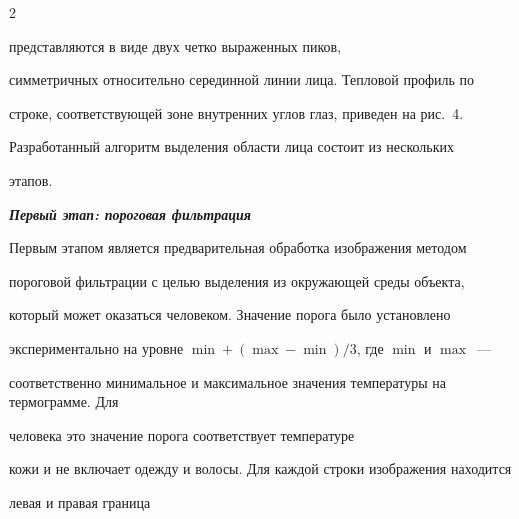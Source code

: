 \begin{multicols}{2}





\bigskip


\addtocounter{figure}{1}





\noindent


 пред\-став\-ля\-ют\-ся в виде двух четко выраженных пиков, 


симметричных относительно серединной линии лица. Тепловой профиль по 


строке, соответствующей зоне внутренних углов глаз, приведен на рис.~4. 














  Разработанный алгоритм выделения области лица состоит из нескольких 


этапов.


  


  \medskip


  


  \noindent


  {\bfseries\textit{Первый этап: пороговая фильтрация}}


  \smallskip


  


  Первым этапом является предварительная обработка изображения методом 


пороговой фильтрации с целью выделения из окружающей среды объекта, 


который может оказаться человеком. Значение порога было установлено 


экспериментально на уровне $\min + (\max - \min)/3$, где $\min$ и $\max$~--- 


соответственно минимальное и максимальное значения температуры на термограмме. Для 


человека это значение порога соответствует температуре 


кожи и не включает одежду и волосы. Для каждой строки изображения находится 


левая и правая граница\linebreak\vspace*{-12pt}


\pagebreak





\end{multicols}





